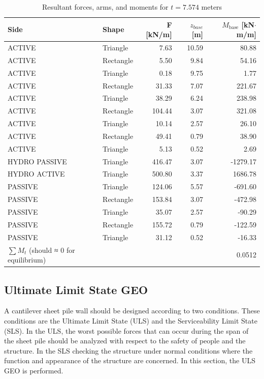 \begin{table}[H]
  \centering
  \caption{Resultant forces, arms, and moments for $t = 7.574$ meters}
  \label{tab:forces_arms_moments_9713}
  \small
  \setlength{\tabcolsep}{8pt}
  \renewcommand{\arraystretch}{1.15}
  \begin{tabular}{@{}l l r r r@{}}
    \toprule
    Side & Shape &
    F [kN/m] & $z_{base}$ [m] &
    $M_{\text{base}}$ [kN$\cdot$m/m] \\
    \midrule
    ACTIVE  & Triangle  &   7.63  & 10.59 &  80.88 \\
    ACTIVE  & Rectangle &   5.50  &  9.84 &  54.16 \\
    ACTIVE  & Triangle  &   0.18  &  9.75 &   1.77 \\
    ACTIVE  & Rectangle &  31.33  &  7.07 & 221.67 \\
    ACTIVE  & Triangle  &  38.29  &  6.24 & 238.98 \\
    ACTIVE  & Rectangle & 104.44  &  3.07 & 321.08 \\
    ACTIVE  & Triangle  &  10.14  &  2.57 &  26.10 \\
    ACTIVE  & Rectangle &  49.41  &  0.79 &  38.90 \\
    ACTIVE  & Triangle  &   5.13  &  0.52 &   2.69 \\
    HYDRO PASSIVE   & Triangle  & 416.47  &  3.07 & -1279.17 \\
    HYDRO ACTIVE    & Triangle  & 500.80  &  3.37 & 1686.78 \\
    PASSIVE & Triangle  & 124.06  &  5.57 &  -691.60 \\
    PASSIVE & Rectangle & 153.84  &  3.07 &  -472.98 \\
    PASSIVE & Triangle  &  35.07  &  2.57 &   -90.29 \\
    PASSIVE & Rectangle & 155.72  &  0.79 &  -122.59 \\
    PASSIVE & Triangle  &  31.12  &  0.52 &   -16.33 \\
    \midrule
    $\sum M_{t}$ (should ≈ 0 for equilibrium) & & & & 0.0512 \\
    \bottomrule
  \end{tabular}
\end{table}

\subsection{Ultimate Limit State GEO}

A cantilever sheet pile wall should be designed according to two conditions. These conditions are the Ultimate Limit State (ULS) and the Serviceability Limit State (SLS). In the ULS, the worst possible forces that can occur during the span of the sheet pile should be analyzed with respect to the safety of people and the structure. In the SLS checking the structure under normal conditions where the function and appearance of the structure are concerned. In this section, the ULS GEO is performed.

